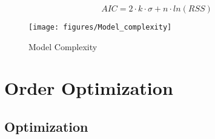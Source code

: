  \begin{equation}
	AIC = 2 \cdot k \cdot \sigma + n \cdot ln(RSS)
	\label{eq:aic_rms_adapt}
\end{equation}

\begin{figure}[!htb]
    \centering
    \texttt{[image: figures/Model\_complexity]} %
    \caption[2D Example Least Square vs. Gruop LASSO]{Model Complexity}
    \label{fig:model_complexity}
\end{figure}




\section{Order Optimization}
\label{sec:order_opt}



\subsection{Optimization}
\label{sec:optimization}




